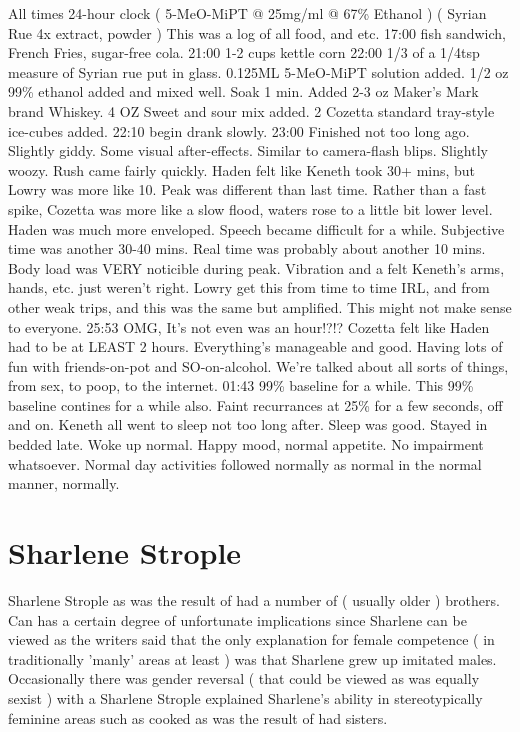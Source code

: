 \documentclass[12pt]{book}
\begin{document}
All times 24-hour clock ( 5-MeO-MiPT @ 25mg/ml @ 67\% Ethanol ) ( Syrian Rue 4x extract, powder ) This was a log of all food, and etc. 17:00 fish sandwich, French Fries, sugar-free cola. 21:00 1-2 cups kettle corn 22:00 1/3 of a 1/4tsp measure of Syrian rue put in glass. 0.125ML 5-MeO-MiPT solution added. 1/2 oz 99\% ethanol added and mixed well. Soak 1 min. Added 2-3 oz Maker's Mark brand Whiskey. 4 OZ Sweet and sour mix added. 2 Cozetta standard tray-style ice-cubes added. 22:10 begin drank slowly. 23:00 Finished not too long ago. Slightly giddy. Some visual after-effects. Similar to camera-flash blips. Slightly woozy. Rush came fairly quickly. Haden felt like Keneth took 30+ mins, but Lowry was more like 10. Peak was different than last time. Rather than a fast spike, Cozetta was more like a slow flood, waters rose to a little bit lower level. Haden was much more enveloped. Speech became difficult for a while. Subjective time was another 30-40 mins. Real time was probably about another 10 mins. Body load was VERY noticible during peak. Vibration and a felt Keneth's arms, hands, etc. just weren't right. Lowry get this from time to time IRL, and from other weak trips, and this was the same but amplified. This might not make sense to everyone. 25:53 OMG, It's not even was an hour!?!? Cozetta felt like Haden had to be at LEAST 2 hours. Everything's manageable and good. Having lots of fun with friends-on-pot and SO-on-alcohol. We're talked about all sorts of things, from sex, to poop, to the internet. 01:43 99\% baseline for a while. This 99\% baseline contines for a while also. Faint recurrances at 25\% for a few seconds, off and on. Keneth all went to sleep not too long after. Sleep was good. Stayed in bedded late. Woke up normal. Happy mood, normal appetite. No impairment whatsoever. Normal day activities followed normally as normal in the normal manner, normally.



\chapter{Sharlene Strople}

Sharlene Strople as was the result of had a number of ( usually older ) brothers. Can has a certain degree of unfortunate implications since Sharlene can be viewed as the writers said that the only explanation for female competence ( in traditionally 'manly' areas at least ) was that Sharlene grew up imitated males. Occasionally there was gender reversal ( that could be viewed as was equally sexist ) with a Sharlene Strople explained Sharlene's ability in stereotypically feminine areas such as cooked as was the result of had sisters.
\end{document}
